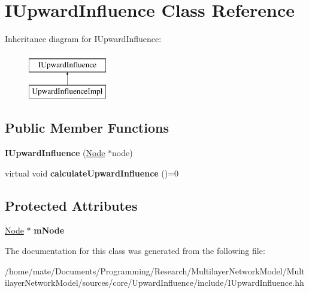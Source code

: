 \hypertarget{classIUpwardInfluence}{}\section{I\+Upward\+Influence Class Reference}
\label{classIUpwardInfluence}
Inheritance diagram for I\+Upward\+Influence\+:\begin{figure}[H]
\begin{center}
\leavevmode
\includegraphics[height=2.000000cm]{classIUpwardInfluence}
\end{center}
\end{figure}
\subsection*{Public Member Functions}
\begin{DoxyCompactItemize}
\item 
{\bfseries I\+Upward\+Influence} (\hyperlink{classNode}{Node} $\ast$node)\hypertarget{classIUpwardInfluence_adc85bc94bdd2b99e474db59901e1cc7b}{}\label{classIUpwardInfluence_adc85bc94bdd2b99e474db59901e1cc7b}

\item 
virtual void {\bfseries calculate\+Upward\+Influence} ()=0\hypertarget{classIUpwardInfluence_adcb9517abfc35398e212fd47af22fdb0}{}\label{classIUpwardInfluence_adcb9517abfc35398e212fd47af22fdb0}

\end{DoxyCompactItemize}
\subsection*{Protected Attributes}
\begin{DoxyCompactItemize}
\item 
\hyperlink{classNode}{Node} $\ast$ {\bfseries m\+Node}\hypertarget{classIUpwardInfluence_aba560a3989e018d2526b14ad91d52ea4}{}\label{classIUpwardInfluence_aba560a3989e018d2526b14ad91d52ea4}

\end{DoxyCompactItemize}


The documentation for this class was generated from the following file\+:\begin{DoxyCompactItemize}
\item 
/home/mate/\+Documents/\+Programming/\+Research/\+Multilayer\+Network\+Model/\+Multilayer\+Network\+Model/sources/core/\+Upward\+Influence/include/I\+Upward\+Influence.\+hh\end{DoxyCompactItemize}
